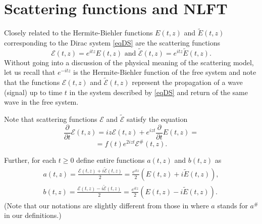 \documentclass[11pt,twoside,reqno]{amsart}
\def\ti{\tilde}
\def\pa{\partial}
\def\EE{{\mathcal E}}
\theoremstyle{plain}
\numberwithin{equation}{section}
\begin{document}










\section{Scattering functions and NLFT}\label{NLFT}


Closely related  to the Hermite-Biehler functions $E(t,z)$ and $\ti E(t,z)$ corresponding to the Dirac system \eqref{eqDS} are the scattering
functions
$$\EE(t,z)=e^{itz}E(t,z)\textrm{ and }\ti\EE(t,z)=e^{itz}\ti E(t,z).$$
Without going into a discussion of the physical meaning of the scattering model, let us recall that $e^{-itz}$
is the Hermite-Biehler function of the free system and note that the functions $\EE(t,z)$ and $\ti\EE(t,z)$ represent the propagation of
a wave (signal) up to time $t$ in the system described by \eqref{eqDS}  and return of the same wave in the free system.

Note that scattering functions $\EE$ and $\ti\EE$ satisfy the equation
$$\frac \pa {\pa  t} \EE(t,z)=iz\EE(t,z)+e^{izt}\frac \pa {\pa  t} E(t,z)=$$
\begin{equation}=f(t)e^{2izt}\EE^\#(t,z).
\label{eqH}\end{equation}

Further, for each $t\geq 0$ define entire functions $a(t,z)$ and $b(t,z)$ as
\begin{equation}\begin{gathered}a(t,z)=\frac {\EE(t,z) +i\ti\EE(t,z)}2=\frac {e^{itz}}2 (E(t,z)+i\ti E(t,z)), \\  b(t,z)=
\frac {\EE(t,z) -i\ti\EE(t,z)}2=\frac {e^{itz}}2 (E(t,z)-i\ti E(t,z)).\label{eqab}\end{gathered}\end{equation}
(Note that our notations are slightly different from those in \cite{TT} where $a$ stands for $a^\#$ in our definitions.)
\end{document}
